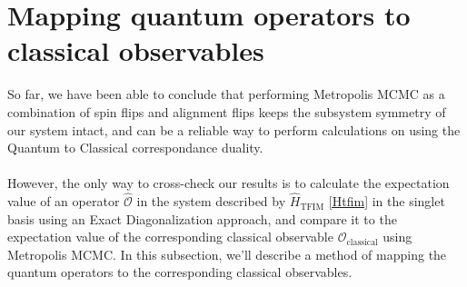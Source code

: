 \documentclass[../journal_main.tex]{subfiles}
\begin{document}
\section{Mapping quantum operators to classical observables}
So far, we have been able to conclude that performing Metropolis MCMC as a combination of spin flips and alignment flips keeps the subsystem symmetry of our system intact, and can be a reliable way to perform calculations on using the Quantum to Classical correspondance duality.~\\~\\ 
However, the only way to cross-check our results is to calculate the expectation value of an operator $\hat{\mathcal{O}}$ in the system described by $\hat{H}_\text{TFIM}$ \eqref{Htfim} in the singlet basis using an Exact Diagonalization approach, and compare it to the expectation value of the corresponding classical observable $\mathcal{O}_\text{classical}$ using Metropolis MCMC. In this subsection, we'll describe a method of mapping the quantum operators to the corresponding classical observables.~\\~\\
\end{document}
